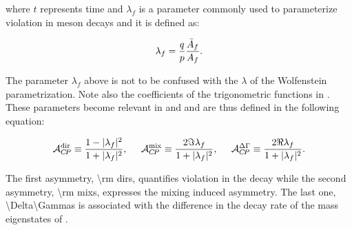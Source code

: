 \noindent where $t$ represents time and $\lambda_f$ is a parameter commonly used to parameterize
\CP violation in meson decays and it is defined as:

\begin{equation}
  \centering
  \lambda_{f} = \frac{q}{p} \frac{\bar{A}_f}{A_f}. %
\label{lambda_cpv}
\end{equation}

\noindent The parameter $\lambda_f$ above is not to be confused with the $\lambda$ of the
Wolfenstein parametrization. Note also the coefficients of the trigonometric functions in
. These parameters become relevant in 
and  and are thus defined in the following equation:

\begin{equation}
  \centering
  \Acp{\rm dir}      \equiv \frac{ 1-|\lambda_f|^2} {1 + |\lambda_f|^2},\;\;\;\;\;
  \Acp{\rm mix}      \equiv \frac{ 2 \Im\lambda_f} {1 + |\lambda_f|^2},\;\;\;\;\;
  \Acp{\Delta\Gamma} \equiv \frac{ 2 \Re\lambda_f} {1 + |\lambda_f|^2}.
\label{cp_asym_lambda}
\end{equation}

\noindent The first asymmetry, \Acp{\rm dir}, quantifies \CP violation in the decay while the
second asymmetry, \Acp{\rm mix}, expresses the mixing induced \CP asymmetry. The last one,
\Acp{\Delta\Gamma} is associated with the difference in the decay rate of the mass eigenstates of .
